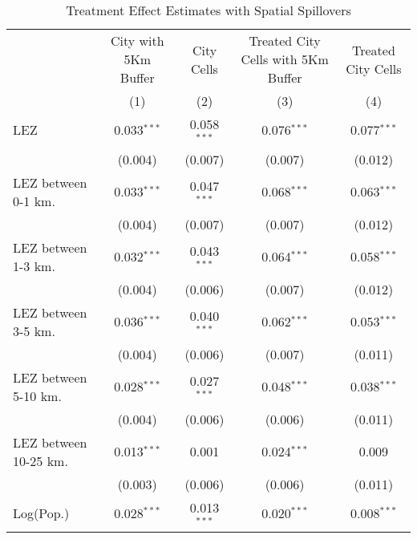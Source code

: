 
\begin{table}[htbp]
   \caption{\label{tab:te_spillovers_conley} Treatment Effect Estimates with Spatial Spillovers}
   \centering
   \small
   \begin{tabular}{lcccc}
      \tabularnewline \midrule \midrule
                            & City with 5Km Buffer & City Cells    & Treated City Cells with 5Km Buffer & Treated City Cells \\   
                            & (1)                  & (2)           & (3)                                & (4)\\  
      LEZ                   & 0.033$^{***}$        & 0.058$^{***}$ & 0.076$^{***}$                      & 0.077$^{***}$\\   
                            & (0.004)              & (0.007)       & (0.007)                            & (0.012)\\   
      LEZ between 0-1 km.   & 0.033$^{***}$        & 0.047$^{***}$ & 0.068$^{***}$                      & 0.063$^{***}$\\   
                            & (0.004)              & (0.007)       & (0.007)                            & (0.012)\\   
      LEZ between 1-3 km.   & 0.032$^{***}$        & 0.043$^{***}$ & 0.064$^{***}$                      & 0.058$^{***}$\\   
                            & (0.004)              & (0.006)       & (0.007)                            & (0.012)\\   
      LEZ between 3-5 km.   & 0.036$^{***}$        & 0.040$^{***}$ & 0.062$^{***}$                      & 0.053$^{***}$\\   
                            & (0.004)              & (0.006)       & (0.007)                            & (0.011)\\   
      LEZ between 5-10 km.  & 0.028$^{***}$        & 0.027$^{***}$ & 0.048$^{***}$                      & 0.038$^{***}$\\   
                            & (0.004)              & (0.006)       & (0.006)                            & (0.011)\\   
      LEZ between 10-25 km. & 0.013$^{***}$        & 0.001         & 0.024$^{***}$                      & 0.009\\   
                            & (0.003)              & (0.006)       & (0.006)                            & (0.011)\\   
      Log(Pop.)             & 0.028$^{***}$        & 0.013$^{***}$ & 0.020$^{***}$                      & 0.008$^{***}$\\   

\end{tabular}
\end{table}
